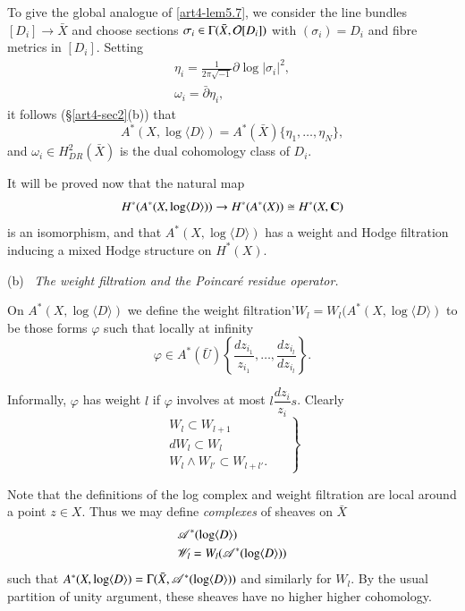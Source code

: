 To give the global analogue of \eqref{art4-lem5.7}, we consider the line bundles $[D_i] \to \bar{X}$ and choose sections $\sigma_i \in \Gamma (\bar{X}, \mathcal{O}[D_i])$ with $(\sigma_i) = D_i$ and fibre metrics in $[D_i]$. Setting
\begin{gather*}
\eta_i = \frac{1}{2\pi \sqrt{-1}} \partial \log |\sigma_i|^2,\\
\omega_i = \bar{\partial} \eta_i,
\end{gather*}
it follows (\cf \S \ref{art4-sec2}(b)) that
\begin{equation}
A^\ast (X, \log \langle D \rangle) = A^\ast (\bar{X}) \{\eta_1, \ldots , \eta_N\}, \label{art4-eq5.9}
\end{equation}
and $\omega_i \in H^2_{DR} (\bar{X})$ is the dual cohomology class of $D_i$.

It will be proved now that the natural map
$$
H^\ast (A^\ast (X, \log \langle D \rangle)) \to H^\ast (A^\ast (X)) \cong H^\ast (X, \mathbf{C})
$$
is an isomorphism, and that $A^\ast (X, \log \langle D \rangle)$ has a weight and Hodge filtration inducing a mixed Hodge structure on $H^\ast (X)$.

\medskip
\noindent
(b)~ \textit{The weight filtration and the Poincar\'e residue operator.}

\begin{defi*}
On $A^\ast (X, \log \langle D \rangle)$ we define the weight filtration'\break $W_l = W_l (A^\ast (X, \log \langle D \rangle)$  to be those forms $\varphi$ such that locally at infinity
$$
\varphi \in A^\ast (\bar{U}) \left\{\frac{dz_{i_1}}{z_{i_1}}, \ldots, \frac{dz_{i_l}}{dz_{i_l}} \right\}.
$$
\end{defi*}

Informally, $\varphi$ has weight $l$ if $\varphi$ involves at most $l \dfrac{dz_i}{z_i}s$. Clearly
\begin{equation}
\left. 
\begin{aligned}
W_l \subset W_{l+1} \;\; & \\
dW_l \subset W_l \;\; & \\
W_l \wedge W_{l'} \subset W_{l+l'}. \;\;
\end{aligned}
\right\}\label{art4-eq5.10} 
\end{equation}\pageoriginale

Note that the definitions of the log complex and weight filtration are local around a point $z \in X$. Thus we may define \textit{complexes} of sheaves on $\bar{X}$
\begin{align*}
& \mathscr{A}^\ast (\log \langle D \rangle)\\
& \mathscr{W}_l = W_l (\mathscr{A}^\ast (\log \langle D \rangle))
\end{align*}
such that  $A^\ast (X, \log \langle D \rangle) = \Gamma (\bar{X}, \mathscr{A}^\ast (\log \langle D \rangle))$ and similarly for $W_l$. By the usual partition of unity argument, these sheaves have no higher higher cohomology.

